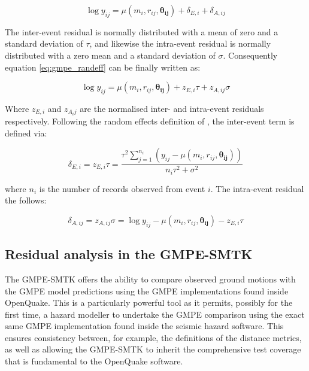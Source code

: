 \begin{equation}
\log y_{ij} = \mu \left( {m_i, r_{ij}, \mathbf{\theta_{ij}}} \right) +  \delta_{E, i} + \delta_{A, ij}
\label{eq:gmpe_randeff}
\end{equation}

The inter-event residual is normally distributed with a mean of zero and a standard deviation of $\tau$, and likewise the intra-event residual is normally distributed with a zero mean and a standard deviation of $\sigma$. 
Consequently equation \ref{eq:gmpe_randeff} can be finally written as:

\begin{equation}
\log y_{ij} = \mu \left( {m_i, r_{ij}, \mathbf{\theta_{ij}}} \right) +  z_{E,i}\tau + z_{A, ij}\sigma
\label{eq:gmpe_re_resid}
\end{equation}

Where $z_{E, i}$ and $z_{A_ ij}$ are the normalised inter- and intra-event residuals respectively. Following the random effects definition of \cite{AbrahamsonYoungs1992}, the inter-event term is defined via:

\begin{equation}
\delta_{E, i} = z_{E, i} \tau = \frac{\tau^2 \sum\limits_{j = 1}^{n_i} \left( {y_{ij} - \mu \left( {m_i, r_{ij}, \mathbf{\theta_{ij}}} \right)}\right)}{n_i \tau^2 + \sigma^2}
\label{eq:inter_res}
\end{equation}

\noindent where $n_i$ is the number of records observed from event $i$. The intra-event residual the follows:

\begin{equation}
\delta_{A, ij} = z_{A, ij}\sigma = \log y_{ij} - \mu \left( {m_i, r_{ij}, \mathbf{\theta_{ij}}} \right) - z_{E, i}\tau
\label{eq:intra_res}
\end{equation}

\subsection{Residual analysis in the GMPE-SMTK}

The GMPE-SMTK offers the ability to compare observed ground motions with the GMPE model predictions using the GMPE implementations found inside OpenQuake. This is a particularly powerful tool as it permits, possibly for the first time, a hazard modeller to undertake the GMPE comparison using the exact same GMPE implementation found inside the seismic hazard software. This ensures consistency between, for example, the definitions of the distance metrics, as well as allowing the GMPE-SMTK to inherit the comprehensive test coverage that is fundamental to the OpenQuake software. 

